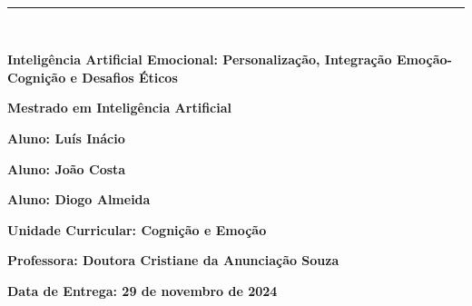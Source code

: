 \documentclass[a4paper,12pt]{report}
\begin{document}
	
	\begin{titlepage}
		\centering
		\vspace*{-2cm} %
		
		\hfill%
		\\[0.5cm]
		
		\noindent
		{\color{barraazul}\rule{\textwidth}{1mm}} %
		\\[1cm]
		
		{\LARGE  \textbf{Inteligência Artificial Emocional: Personalização, Integração Emoção-Cognição e Desafios Éticos} \par}
		\vspace{1.5cm}
		
		{\Large \textbf{Mestrado em Inteligência Artificial}} \par
		\vspace{3cm}
		
		{\large \textbf{Aluno: Luís Inácio}} \par
		{\large \textbf{Aluno: João Costa}} \par
		{\large \textbf{Aluno: Diogo Almeida}} \par
		
		\vspace{3cm}
		
		{\large \textbf{Unidade Curricular: Cognição e Emoção}} \par
		\vspace{1cm}
		
		{\large \textbf{Professora: Doutora Cristiane da Anunciação Souza}} \par
		\vfill
		
		{\large \textbf{Data de Entrega: 29 de novembro de 2024}} \par
	\end{titlepage}
	
\end{document}
